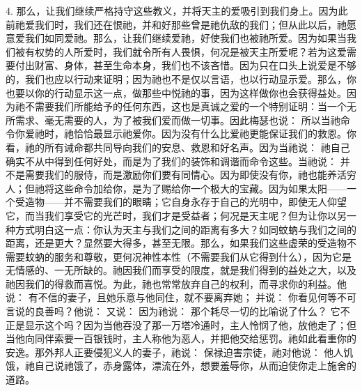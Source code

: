 4. 那么，让我们继续严格持守这些教义，并将天主的爱吸引到我们身上。因为此前祂爱我们时，我们还在恨祂，并和好那些曾是祂仇敌的我们；但从此以后，祂愿意爱我们如同爱祂。那么，让我们继续爱祂，好使我们也被祂所爱。因为如果当我们被有权势的人所爱时，我们就令所有人畏惧，何况是被天主所爱呢？若为这爱需要付出财富、身体，甚至生命本身，我们也不该吝惜。因为只在口头上说爱是不够的，我们也应以行动来证明；因为祂也不是仅以言语，也以行动显示爱。那么，你也要以你的行动显示这一点，做那些中悦祂的事，因为这样做你也会获得益处。因为祂不需要我们所能给予的任何东西，这也是真诚之爱的一个特别证明：当一个无所需求、毫无需要的人，为了被我们爱而做一切事。因此梅瑟也说：  所以当祂命令你爱祂时，祂恰恰最显示祂爱你。因为没有什么比爱祂更能保证我们的救恩。你看，祂的所有诫命都共同导向我们的安息、救恩和好名声。因为当祂说：  祂自己确实不从中得到任何好处，而是为了我们的装饰和调谐而命令这些。当祂说： 并不是需要我们的服侍，而是激励你们要有同情心。因为即使没有你，祂也能养活穷人；但祂将这些命令加给你，是为了赐给你一个极大的宝藏。因为如果太阳——一个受造物——并不需要我们的眼睛；它自身永存于自己的光明中，即使无人仰望它，而当我们享受它的光芒时，我们才是受益者；何况是天主呢？但为让你以另一种方式明白这一点：你认为天主与我们之间的距离有多大？如同蚊蚋与我们之间的距离，还是更大？显然要大得多，甚至无限。那么，如果我们这些虚荣的受造物不需要蚊蚋的服务和尊敬，更何况神性本性（不需要我们从它得到什么），因为它是无情感的、一无所缺的。祂因我们而享受的限度，就是我们得到的益处之大，以及祂因我们的得救而喜悦。为此，祂也常常放弃自己的权利，而寻求你的利益。他说： 有不信的妻子，且她乐意与他同住，就不要离弃她； 并说： 你看见何等不可言说的良善吗？他说： 又说： 因为祂说：  那个耗尽一切的比喻说了什么？ 它不正是显示这个吗？因为当他吞没了那一万塔冷通时，主人怜悯了他，放他走了；但当他向同伴索要一百银钱时，主人称他为恶人，并把他交给惩罚。祂如此看重你的安逸。那外邦人正要侵犯义人的妻子，祂说：  保禄迫害宗徒，祂对他说： 他人饥饿，祂自己说祂饿了，赤身露体，漂流在外，想要羞辱你，从而迫使你走上施舍的道路。\par

